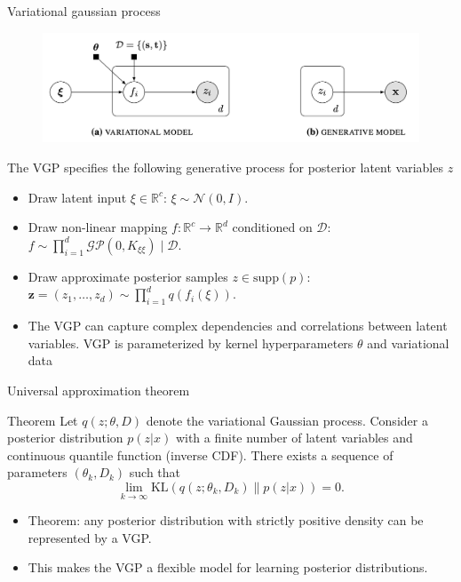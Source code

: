 \documentclass{beamer}
\begin{document}
\begin{frame}{Variational gaussian process}
    \begin{figure}{}
        \centering
        \includegraphics[scale=0.24]{images/figure1a.png}
    \end{figure}

    The VGP specifies the following generative process for posterior latent variables \(z\)

    \begin{itemize}
        \item Draw latent input $\xi \in \mathbb{R}^c$: $\xi \sim \mathcal{N}(0, I)$.
        \item Draw non-linear mapping $f: \mathbb{R}^c \to \mathbb{R}^d$ conditioned on $\mathcal{D}$: $f \sim \prod_{i=1}^d \mathcal{GP}(0, K_{\xi\xi}) \mid \mathcal{D}$.
        \item Draw approximate posterior samples $z \in \text{supp}(p)$: $\mathbf{z} = (z_1, \ldots, z_d) \sim \prod_{i=1}^d q(f_i(\xi))$.
        \item The VGP can capture complex dependencies and correlations between latent variables. VGP is parameterized by kernel hyperparameters $\theta$ and variational data
    \end{itemize}

\end{frame}



\begin{frame}{Universal approximation theorem}
    \begin{block}{Theorem} Let $q(z; \theta, D)$ denote the variational Gaussian process. Consider a posterior distribution $p(z | x)$ with a finite number of latent variables and continuous quantile function (inverse CDF). There exists a sequence of parameters $(\theta_k, D_k)$ such that
        \[
        \lim_{k \to \infty} \text{KL}(q(z; \theta_k, D_k) \| p(z | x)) = 0.
        \]
    \end{block}

    \begin{itemize}
        \item Theorem: any posterior distribution with strictly positive density can be represented by a VGP.
        \item This makes the VGP a flexible model for learning posterior distributions.
    \end{itemize}
\end{frame}
\end{document}
